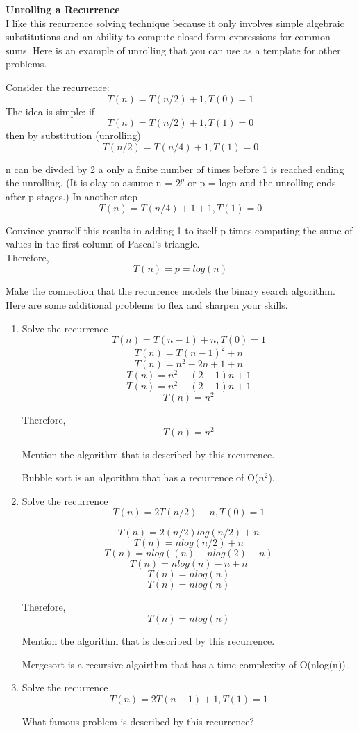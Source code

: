 \documentclass{article}
\begin{document}
\noindent \textbf{Unrolling a Recurrence}\\

\noindent I like this recurrence solving technique because it only involves
simple algebraic substitutions and an ability to compute closed form expressions
for common sums. Here is an example of unrolling that you can use as a template
for other problems.

Consider the recurrence:
\[ T(n) = T(n/2) + 1, T(0) = 1 \]
The idea is simple: if
\[ T(n) = T(n/2) + 1, T(1) = 0 \]
then by substitution (unrolling)
\[ T(n/2) = T(n/4) + 1, T(1) = 0 \]

\noindent n can be divded by 2 a only a finite number of times before 1 is
reached ending the unrolling. (It is olay to assume n = $2^p$ or p = logn and the
unrolling ends after p stages.) In another step
\[ T(n) = T(n/4) + 1 + 1, T(1) = 0 \]

\noindent Convince yourself this results in adding 1 to itself p times computing
the sume of values in the first column of Pascal's triangle.\\
Therefore,
\[ T(n) = p = log(n) \]

\noindent Make the connection that the recurrence models the binary search algorithm.\\
\noindent Here are some additional problems to flex and sharpen your skills.

\begin{enumerate}
    \item Solve the recurrence
            \[ T(n) = T(n-1) + n, T(0) = 1 \]
            \[ T(n) = T(n-1)^2 + n\]
            \[ T(n) = n^2 -2n + 1 + n\]
            \[ T(n) = n^2 - (2-1)n + 1\]
            \[ T(n) = n^2 - (2-1)n + 1\]
            \[T(n) = n^2\]

            Therefore, \[T(n) = n^2\]

            Mention the algorithm that is described by this recurrence.

            Bubble sort is an algorithm that has a recurrence of O($n^2$).
    \item Solve the recurrence
            \[ T(n) = 2T(n/2) + n, T(0) = 1\]
        
            \[ T(n) = 2(n/2)log(n/2) + n \]
            \[ T(n) = nlog(n/2) + n \]
            \[ T(n) = nlog((n) - nlog(2) + n) \]
            \[ T(n) = nlog(n) - n + n \]
            \[ T(n) = nlog(n) \]
            \[ T(n) = nlog(n) \]

            Therefore, \\
            \[T(n) = nlog(n)\]

            Mention the algorithm that is described by this recurrence.

            Mergesort is a recursive algoirthm that has a time complexity of O(nlog(n)).
    \item Solve the recurrence
            \[ T(n) = 2T(n-1) + 1, T(1) = 1 \]
            
            What famous problem is described by this recurrence?
\end{enumerate}
\end{document}
